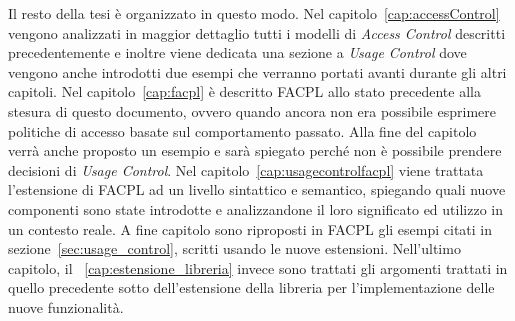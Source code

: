Il resto della tesi è organizzato in questo modo. Nel capitolo~\ref{cap:accessControl} vengono analizzati in maggior dettaglio tutti i modelli di \textit{Access Control} descritti precedentemente e inoltre viene dedicata una sezione a \textit{Usage Control} dove vengono anche introdotti due esempi che verranno portati avanti durante gli altri capitoli. Nel capitolo~\ref{cap:facpl} è descritto FACPL allo stato precedente alla stesura di questo documento, ovvero quando ancora non era possibile esprimere politiche di accesso basate sul comportamento passato. Alla fine del capitolo verrà anche proposto un esempio e sarà spiegato perché non è possibile prendere decisioni di \textit{Usage Control}. Nel capitolo~\ref{cap:usagecontrolfacpl} viene trattata l'estensione di FACPL ad un livello sintattico e semantico, spiegando quali nuove componenti sono state introdotte e analizzandone il loro significato ed utilizzo in un contesto reale. A fine capitolo sono riproposti in FACPL gli esempi citati in sezione~\ref{sec:usage_control}, scritti usando le nuove estensioni. Nell'ultimo capitolo, il ~\ref{cap:estensione_libreria} invece sono trattati gli argomenti trattati in quello precedente sotto dell'estensione della libreria per l'implementazione delle nuove funzionalità.
